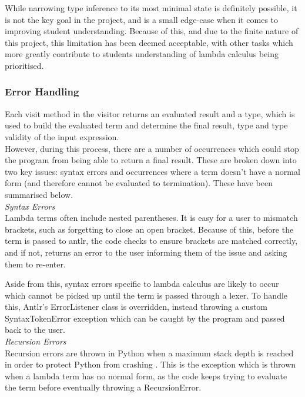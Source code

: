 \documentclass[a4paper,11pt]{report}
\begin{document}
While narrowing type inference to its most minimal state is definitely possible, it is not the key goal in the project, and is a small edge-case when it comes to improving student understanding. Because of this, and due to the finite nature of this project, this limitation has been deemed acceptable, with other tasks which more greatly contribute to students understanding of lambda calculus being prioritised.

\subsubsection{Error Handling}
Each visit method in the visitor returns an evaluated result and a type, which is used to build the evaluated term and determine the final result, type and type validity of the input expression.\\

However, during this process, there are a number of occurrences which could stop the program from being able to return a final result. These are broken down into two key issues: syntax errors and occurrences where a term doesn't have a normal form (and therefore cannot be evaluated to termination). These have been summarised below.\\

\textit{Syntax Errors}\\
Lambda terms often include nested parentheses. It is easy for a user to mismatch brackets, such as forgetting to close an open bracket. Because of this, before the term is passed to antlr, the code checks to ensure brackets are matched correctly, and if not, returns an error to the user informing them of the issue and asking them to re-enter.

Aside from this, syntax errors specific to lambda calculus are likely to occur which cannot be picked up until the term is passed through a lexer. To handle this, Antlr's ErrorListener class is overridden, instead throwing a custom SyntaxTokenError exception which can be caught by the program and passed back to the user.\\

\textit{Recursion Errors}\\
Recursion errors are thrown in Python when a maximum stack depth is reached in order to protect Python from crashing \cite{PythonStack2019}. This is the exception which is thrown when a lambda term has no normal form, as the code keeps trying to evaluate the term before eventually throwing a RecursionError.
\end{document}
